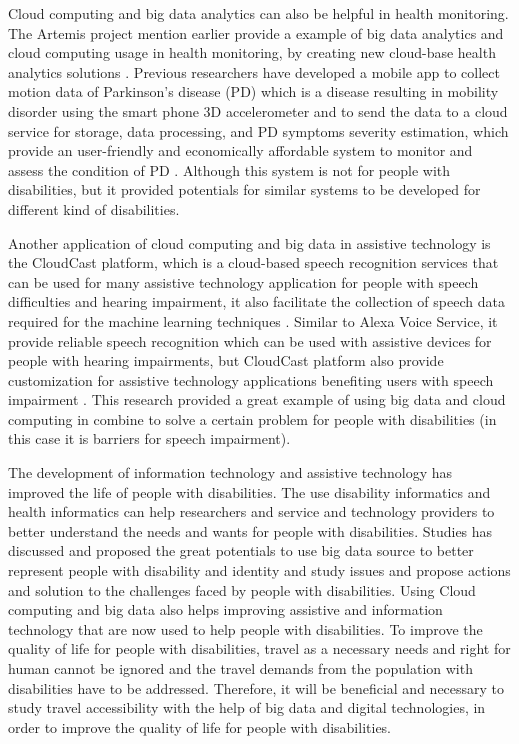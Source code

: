 Cloud computing and big data analytics can also be helpful in health monitoring. The Artemis project mention earlier
provide a example of big data analytics and cloud computing usage in health monitoring, by creating new cloud-base
health analytics solutions \cite{Khazaei14}. Previous researchers have developed a mobile app to collect motion 
data of Parkinson's disease (PD) which is a disease resulting in mobility disorder using the smart phone 3D 
accelerometer and to send the data to a cloud service for storage, data processing, and PD symptoms severity
estimation, which provide an user-friendly and economically affordable system to monitor and assess the condition
of PD \cite{info:doi/10.2196/mhealth.3956}. Although this system is not for people with disabilities, but it 
provided potentials for similar systems to be developed for different kind of disabilities. 

Another application of cloud computing and big data in assistive technology is the CloudCast platform, which is a 
cloud-based speech recognition services that can be used for many assistive technology application for people
with speech difficulties and hearing impairment, it also facilitate the collection of speech data required for
the machine learning techniques \cite{cunningham2017cloud}. Similar to Alexa Voice Service, it provide reliable 
speech recognition which can be used with assistive devices for people with hearing impairments, but CloudCast
platform also provide customization for assistive technology applications benefiting users with speech 
impairment \cite{cunningham2017cloud}. This research provided a great example of using big data and cloud 
computing in combine to solve a certain problem for people with disabilities (in this case it is barriers for speech impairment). 

The development of information technology and assistive technology has improved the life of people with disabilities.
The use disability informatics and health informatics can help researchers and service and technology providers 
to better understand the needs and wants for people with disabilities. Studies has discussed and proposed the 
great potentials to use big data source to better represent people with disability and identity and study 
issues and propose actions and solution to the challenges faced by people with disabilities. Using Cloud 
computing and big data also helps improving assistive and information technology that are now used to 
help people with disabilities. To improve the quality of life for people with disabilities, travel as a 
necessary needs and right for human cannot be ignored and the travel demands from the population with 
disabilities have to be addressed. Therefore, it will be beneficial and necessary to study travel 
accessibility with the help of big data and digital technologies, in order to improve the quality of life for people with disabilities. 

